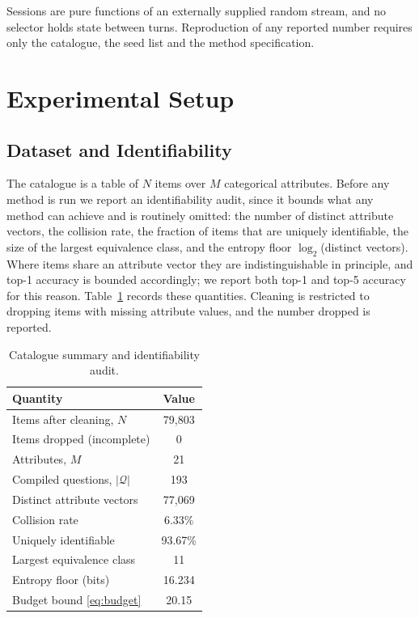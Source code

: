 \documentclass[conference]{IEEEtran}
\newcommand{\Qset}{\mathcal{Q}}
\begin{document}
Sessions are pure functions of an externally supplied random stream, and no
selector holds state between turns. Reproduction of any reported number
requires only the catalogue, the seed list and the method specification.

\section{Experimental Setup}
\label{sec:setup}

\subsection{Dataset and Identifiability}

The catalogue is a table of $N$ items over $M$ categorical
attributes. Before any method is run we report an identifiability audit, since
it bounds what any method can achieve and is routinely omitted: the number of
distinct attribute vectors, the collision rate, the fraction of items that are
uniquely identifiable, the size of the largest equivalence class, and the
entropy floor $\log_2$(distinct vectors). Where items share an attribute
vector they are indistinguishable in principle, and top-1 accuracy is bounded
accordingly; we report both top-1 and top-5 accuracy for this reason.
Table~\ref{tab:dataset} records these quantities. Cleaning is restricted to
dropping items with missing attribute values, and the number dropped is
reported.

\begin{table}[t]
\caption{Catalogue summary and identifiability audit.}
\label{tab:dataset}
\centering
\footnotesize
\begin{tabular}{@{}lc@{}}
\toprule
\textbf{Quantity} & \textbf{Value} \\
\midrule
Items after cleaning, $N$ & 79{,}803 \\
Items dropped (incomplete) & 0 \\
Attributes, $M$ & 21 \\
Compiled questions, $|\Qset|$ & 193 \\
Distinct attribute vectors & 77{,}069 \\
Collision rate & 6.33\% \\
Uniquely identifiable & 93.67\% \\
Largest equivalence class & 11 \\
Entropy floor (bits) & 16.234 \\
Budget bound \eqref{eq:budget} & 20.15 \\
\bottomrule
\end{tabular}
\end{table}
\end{document}
